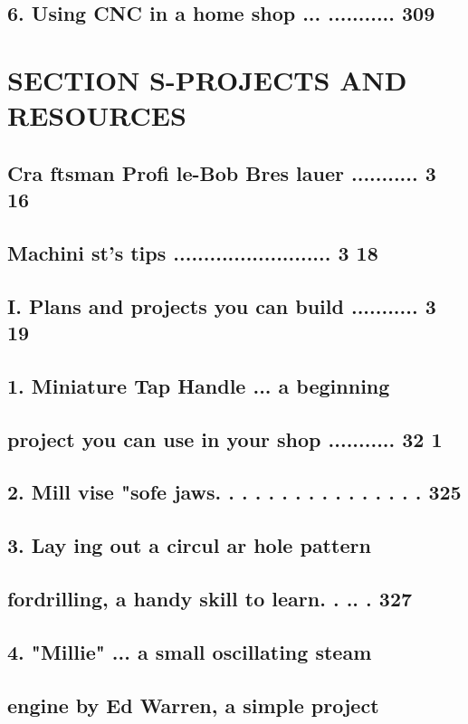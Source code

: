 \section{6. Using CNC in a home shop ... ........... 309}

\chapter{SECTION S-PROJECTS AND RESOURCES}
\section{Cra ftsman Profi le-Bob Bres lauer ........... 3 16}
\section{Machini st's tips .......................... 3 18}
\section{I. Plans and projects you can build ........... 3 19}
\section{1. Miniature Tap Handle ... a beginning}
\section{project you can use in your shop ........... 32 1}
\section{2. Mill vise "sofe jaws. . . . . . . . . . . . . . . . 325}
\section{3. Lay ing out a circul ar hole pattern}
\section{fordrilling, a handy skill to learn. . .. . 327}
\section{4. "Millie" ... a small oscillating steam}
\section{engine by Ed Warren, a simple project}
